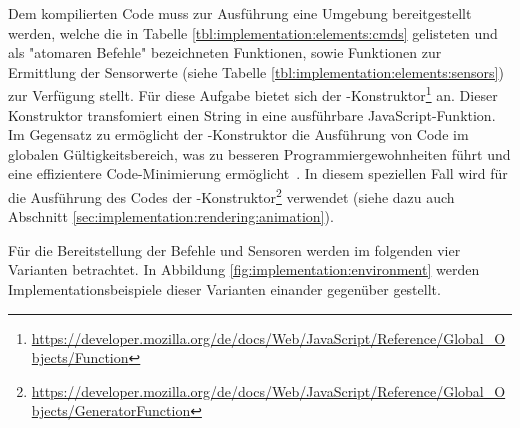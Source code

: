 Dem kompilierten Code muss zur Ausführung eine Umgebung bereitgestellt werden, welche die in Tabelle \ref{tbl:implementation:elements:cmds} gelisteten und als "atomaren Befehle" bezeichneten Funktionen, sowie Funktionen zur Ermittlung der Sensorwerte (siehe Tabelle \ref{tbl:implementation:elements:sensors}) zur Verfügung stellt. Für diese Aufgabe bietet sich der -Konstruktor\footnote{\url{https://developer.mozilla.org/de/docs/Web/JavaScript/Reference/Global_Objects/Function}} an. Dieser Konstruktor transfomiert einen String in eine ausführbare JavaScript-Funk\-tion. Im Gegensatz zu  ermöglicht der -Kon\-struk\-tor die Ausführung von Code im globalen Gültigkeitsbereich, was zu besseren Programmiergewohnheiten führt und eine effizientere Code-Mi\-ni\-mie\-rung ermöglicht~\cite{mdn-function}. In diesem speziellen Fall wird für die Ausführung des Codes der -Kon\-struk\-tor\footnote{\url{https://developer.mozilla.org/de/docs/Web/JavaScript/Reference/Global_Objects/GeneratorFunction}} verwendet (siehe dazu auch Abschnitt \ref{sec:implementation:rendering:animation}).

Für die Bereitstellung der Befehle und Sensoren werden im folgenden vier Varianten betrachtet. In Abbildung \ref{fig:implementation:environment} werden Implementationsbeispiele dieser Varianten einander gegenüber gestellt.


